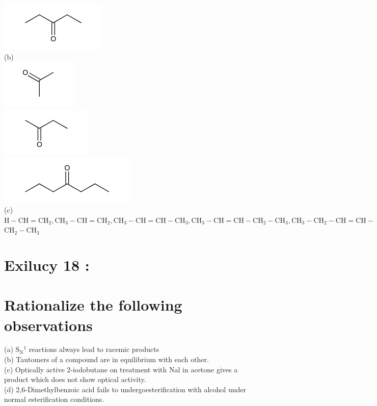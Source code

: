 \documentclass[10pt]{article}
\begin{document}
\includegraphics{smile-0471e0bc244d080ebceb6a58555b423b697ab82f}\\
(b)\\
\includegraphics{smile-7a2b9042f55f9e01513e6cf6fed85b38676de275}\\
\includegraphics{smile-132328762bba6b5ab5cda6cff1ebef8881da99d5}\\
\includegraphics{smile-cc89c5668dc23eb2e14d9a33da4b1679e9b4b79b}\\
(c) $\mathrm{H}-\mathrm{CH}=\mathrm{CH}_{2}, \mathrm{CH}_{3}-\mathrm{CH}=\mathrm{CH}_{2}, \mathrm{CH}_{3}-\mathrm{CH}=\mathrm{CH}-\mathrm{CH}_{3}, \mathrm{CH}_{3}-\mathrm{CH}=\mathrm{CH}-\mathrm{CH}_{2}-\mathrm{CH}_{3}, \mathrm{CH}_{3}-\mathrm{CH}_{2}-\mathrm{CH}=\mathrm{CH}-$ $\mathrm{CH}_{2}-\mathrm{CH}_{3}$

\section*{Exilucy 18 :}
\section*{Rationalize the following observations}
(a) $\mathrm{S}_{\mathrm{N}}{ }^{1}$ reactions always lead to racemic products\\
(b) Tautomers of a compound are in equilibrium with each other.\\
(c) Optically active 2-iodobutane on treatment with Nal in acetone gives a product which does not show optical activity.\\
(d) 2,6-Dimethylbenzoic acid fails to undergoesterification with alcohol under normal esterification conditions.
\end{document}
